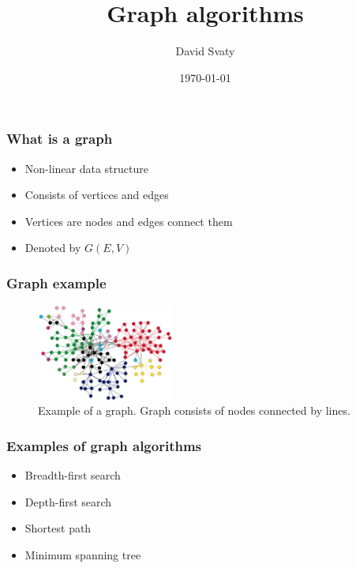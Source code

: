 \documentclass[pdf,fyma2]{beamer}
\title{Graph algorithms}
\author{David Svaty}
\institute{ Faculty of Information Technology, BUT }
\date{\today}
\begin{document}
    
\frame{\titlepage}

\begin{frame}
    \frametitle{What is a graph}
    
    \begin{itemize}
        \item Non-linear data structure
        \pause
        \item Consists of vertices and edges
        \pause
        \item Vertices are nodes and edges connect them
        \pause
        \item Denoted by $G(E,V)$ 
    \end{itemize}
\end{frame}

\begin{frame}
    \frametitle{Graph example}
    \begin{figure}
        \includegraphics[width=170px]{img/graph-algorithms1.png}
        \caption{Example of a graph. Graph consists of nodes connected by lines.}
    \end{figure}
\end{frame}

\begin{frame}
    \frametitle{Examples of graph algorithms}
    \begin{itemize}
        \item Breadth-first search
        \pause
        \item Depth-first search
        \pause
        \item Shortest path
        \pause
        \item Minimum spanning tree 
    \end{itemize}    
\end{frame}
\end{document}
